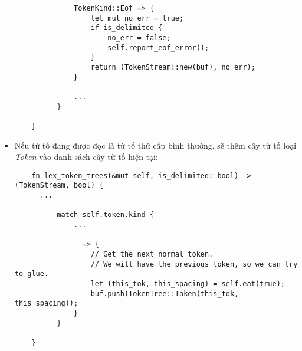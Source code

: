 \begin{itemize}
\begin{lstlisting}
              TokenKind::Eof => {
                  let mut no_err = true;
                  if is_delimited {
                      no_err = false;
                      self.report_eof_error();
                  }
                  return (TokenStream::new(buf), no_err);
              }
              
              ...
          }
  
    }
  \end{lstlisting}
  \item Nếu từ tố đang được đọc là từ tố thứ cấp bình thường, sẽ thêm cây từ tố loại \textit{Token} vào danh sách cây từ tố hiện tại:
  \begin{lstlisting}
    fn lex_token_trees(&mut self, is_delimited: bool) -> (TokenStream, bool) {
      ...
  
          match self.token.kind {
              ...

              _ => {
                  // Get the next normal token.
                  // We will have the previous token, so we can try to glue.
                  let (this_tok, this_spacing) = self.eat(true);
                  buf.push(TokenTree::Token(this_tok, this_spacing));
              }
          }
  
    }
  \end{lstlisting}
\end{itemize}